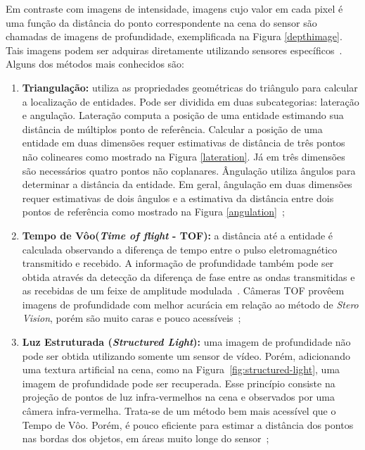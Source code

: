 	Em contraste com imagens de intensidade, imagens cujo valor em cada pixel é uma função da distância do ponto correspondente na cena do sensor são chamadas de imagens de profundidade, exemplificada na Figura \ref{depthimage}. Tais imagens podem ser adquiras diretamente utilizando sensores específicos~\cite{jain}. Alguns dos métodos mais conhecidos são:

		\begin{enumerate}
			\item \textbf{Triangulação:} utiliza as propriedades geométricas do triângulo para calcular a localização de entidades. Pode ser dividida em duas subcategorias: lateração e angulação. Lateração computa a posição de uma entidade estimando sua distância de múltiplos ponto de referência. Calcular a posição de uma entidade em duas dimensões requer estimativas de distância de três pontos não colineares como mostrado na Figura \ref{lateration}. Já em três dimensões são necessários quatro pontos não coplanares. Ângulação utiliza ângulos para determinar a distância da entidade. Em geral, ângulação em duas dimensões requer estimativas de dois ângulos e a estimativa da distância entre dois pontos de referência como mostrado na Figura \ref{angulation}~\cite{triangulacao};

			\item \textbf{Tempo de Vôo(\textit{Time of flight} - TOF):} a distância até a entidade é calculada observando a diferença de tempo entre o pulso eletromagnético transmitido e recebido. A informação de profundidade também pode ser obtida através da detecção da diferença de fase entre as ondas transmitidas e as recebidas de um feixe de amplitude modulada~\cite{jain, fall-detection}. Câmeras TOF provêem imagens de profundidade com melhor acurácia em relação ao método de \textit{Stero Vision}, porém são muito caras e pouco acessíveis~\cite{fall-detection};

			\item \textbf{Luz Estruturada (\textit{Structured Light}):} uma imagem de profundidade não pode ser obtida utilizando somente um sensor de vídeo. Porém, adicionando uma textura artificial na cena, como na Figura~\ref{fig:structured-light}, uma imagem de profundidade pode ser recuperada. Esse princípio consiste na projeção de pontos de luz infra-vermelhos na cena e observados por uma câmera infra-vermelha. Trata-se de um método bem mais acessível que o Tempo de Vôo. Porém, é pouco eficiente para estimar a distância dos pontos nas bordas dos objetos, em áreas muito longe do sensor~\cite{fall-detection};
		\end{enumerate}


